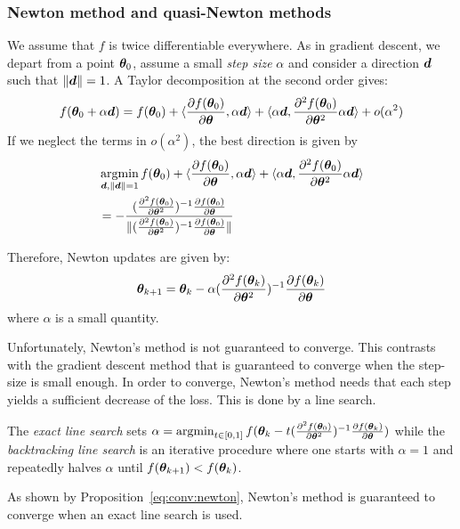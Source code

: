 \subsubsection{Newton method and quasi-Newton methods}
\label{sec:qn}
We assume that $f$ is twice differentiable everywhere.
As in gradient descent, we depart from a point $\thetab_0$, assume a small
\emph{step size} $\alpha$ and consider a direction
$\db$ such that $\|\db\| = 1$.
A Taylor decomposition at the second order gives:
\begin{align}
  f(\thetab_0 + \alpha \db) = f(\thetab_0) + \dotp{ \partialfrac{\thetab}{f(\thetab_0)} }{ \alpha \db } + \dotp{ \alpha \db }{ \partialfrac{\thetab^2}{^2 f(\thetab_0)} \alpha \db } + o(\alpha^2) 
\end{align}
If we neglect the terms in $o(\alpha^2)$, the best direction is given by
\begin{align}
  &\argmin_{\db, \|\db\| = 1} f(\thetab_0) + \dotp{ \partialfrac{\thetab}{f(\thetab_0)} }{ \alpha \db } + \dotp{ \alpha \db }{ \partialfrac{\thetab^2}{^2 f(\thetab_0)} \alpha \db } \\
  &= - \frac{(\partialfrac{\thetab^2}{^2 f(\thetab_0)})^{-1}\partialfrac{\thetab}{f(\thetab_0)}}{\| (\partialfrac{\thetab^2}{^2 f(\thetab_0)})^{-1} \partialfrac{\thetab}{f(\thetab_0)}\|}
\end{align}


Therefore, Newton updates are given by:
\begin{align}
  \thetab_{k+1} = \thetab_k -\alpha (\partialfrac{\thetab^2}{^2 f(\thetab_k)})^{-1} \partialfrac{\thetab}{f(\thetab_k)} \label{eq:update:newton}
\end{align}
where $\alpha$ is a small quantity.

Unfortunately, Newton's method is not guaranteed to converge. This contrasts with the gradient descent method that is guaranteed to converge when the step-size is small enough.
In order to converge, Newton's method needs that each step yields a sufficient decrease of the loss. This is done by a line search.

The \emph{exact line search} sets $\alpha = \argmin_{t \in [0, 1]} f(\thetab_k - t
(\partialfrac{\thetab^2}{^2 f(\thetab_0)})^{-1}
\partialfrac{\thetab}{f(\thetab_k)})$ while
the \emph{backtracking line search} is an iterative procedure where one starts
with $\alpha=1$ and repeatedly halves $\alpha$ until $f(\thetab_{k+1}) < f(\thetab_k)$.

As shown by Proposition~\ref{eq:conv:newton}, Newton's method is guaranteed to converge when an
exact line search is used.

